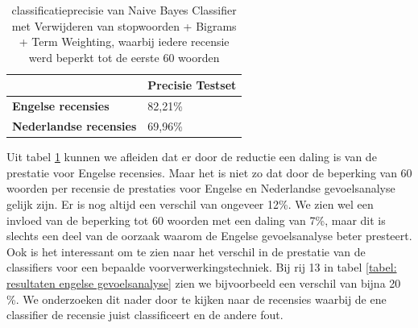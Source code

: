 \begin{table}[h]
\centering
\begin{tabular}{l|l|}
\cline{2-2}
                                                  & {\bf Precisie Testset} \\ \hline
\multicolumn{1}{|l|}{{\bf Engelse recensies}}     & 82,21\%                \\ \hline
\multicolumn{1}{|l|}{{\bf Nederlandse recensies}} & 69,96\%                \\ \hline
\end{tabular}
\caption{classificatieprecisie van Naive Bayes Classifier met Verwijderen van stopwoorden + Bigrams + Term Weighting, waarbij iedere recensie werd beperkt tot de eerste 60 woorden}
\label{tabel: beperking tot 60 woorden}
\end{table}

Uit tabel \ref{tabel: beperking tot 60 woorden} kunnen we afleiden dat er door de reductie een daling is van de prestatie voor Engelse recensies. Maar het is niet zo dat door de beperking van 60 woorden per recensie de prestaties voor Engelse en Nederlandse gevoelsanalyse gelijk zijn. Er is nog altijd een verschil van ongeveer 12\%. We zien wel een invloed van de beperking tot 60 woorden met een daling van 7\%, maar dit is slechts een deel van de oorzaak waarom de Engelse gevoelsanalyse beter presteert.\\

Ook is het interessant om te zien naar het verschil in de prestatie van de classifiers voor een bepaalde voorverwerkingstechniek. Bij rij 13 in tabel \ref{tabel: resultaten engelse gevoelsanalyse} zien we bijvoorbeeld een verschil van bijna 20 \%. We onderzoeken dit nader door te kijken naar de recensies waarbij de ene classifier de recensie juist classificeert en de andere fout.

